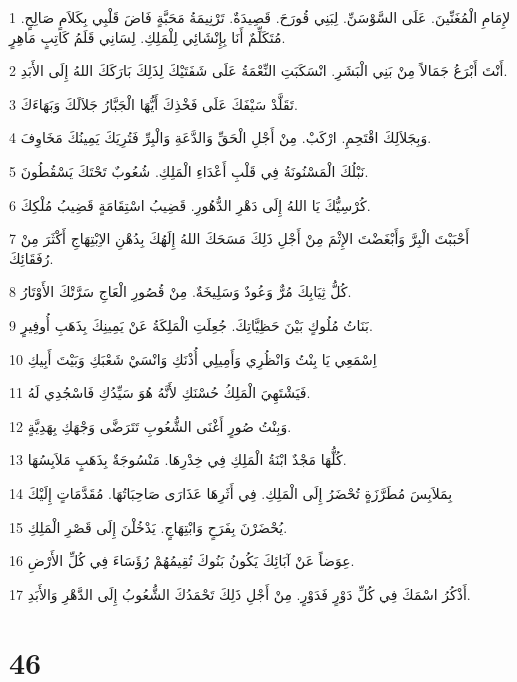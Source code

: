 \par 1 لإِمَامِ الْمُغَنِّينَ. عَلَى السَّوْسَنِّ. لِبَنِي قُورَحَ. قَصِيدَةٌ. تَرْنِيمَةُ مَحَبَّةٍ فَاضَ قَلْبِي بِكَلاَمٍ صَالِحٍ. مُتَكَلِّمٌ أَنَا بِإِنْشَائِي لِلْمَلِكِ. لِسَانِي قَلَمُ كَاتِبٍ مَاهِرٍ.
\par 2 أَنْتَ أَبْرَعُ جَمَالاً مِنْ بَنِي الْبَشَرِ. انْسَكَبَتِ النِّعْمَةُ عَلَى شَفَتَيْكَ لِذَلِكَ بَارَكَكَ اللهُ إِلَى الأَبَدِ.
\par 3 تَقَلَّدْ سَيْفَكَ عَلَى فَخْذِكَ أَيُّهَا الْجَبَّارُ جَلاَلَكَ وَبَهَاءَكَ.
\par 4 وَبِجَلاَلِكَ اقْتَحِمِ. ارْكَبْ. مِنْ أَجْلِ الْحَقِّ وَالدَّعَةِ وَالْبِرِّ فَتُرِيَكَ يَمِينُكَ مَخَاوِفَ.
\par 5 نَبْلُكَ الْمَسْنُونَةُ فِي قَلْبِ أَعْدَاءِ الْمَلِكِ. شُعُوبٌ تَحْتَكَ يَسْقُطُونَ.
\par 6 كُرْسِيُّكَ يَا اللهُ إِلَى دَهْرِ الدُّهُورِ. قَضِيبُ اسْتِقَامَةٍ قَضِيبُ مُلْكِكَ.
\par 7 أَحْبَبْتَ الْبِرَّ وَأَبْغَضْتَ الإِثْمَ مِنْ أَجْلِ ذَلِكَ مَسَحَكَ اللهُ إِلَهُكَ بِدُهْنِ الاِبْتِهَاجِ أَكْثَرَ مِنْ رُفَقَائِكَ.
\par 8 كُلُّ ثِيَابِكَ مُرٌّ وَعُودٌ وَسَلِيخَةٌ. مِنْ قُصُورِ الْعَاجِ سَرَّتْكَ الأَوْتَارُ.
\par 9 بَنَاتُ مُلُوكٍ بَيْنَ حَظِيَّاتِكَ. جُعِلَتِ الْمَلِكَةُ عَنْ يَمِينِكَ بِذَهَبِ أُوفِيرٍ.
\par 10 اِسْمَعِي يَا بِنْتُ وَانْظُرِي وَأَمِيلِي أُذْنَكِ وَانْسَيْ شَعْبَكِ وَبَيْتَ أَبِيكِ
\par 11 فَيَشْتَهِيَ الْمَلِكُ حُسْنَكِ لأَنَّهُ هُوَ سَيِّدُكِ فَاسْجُدِي لَهُ.
\par 12 وَبِنْتُ صُورٍ أَغْنَى الشُّعُوبِ تَتَرَضَّى وَجْهَكِ بِهَدِيَّةٍ.
\par 13 كُلُّهَا مَجْدٌ ابْنَةُ الْمَلِكِ فِي خِدْرِهَا. مَنْسُوجَةٌ بِذَهَبٍ مَلاَبِسُهَا.
\par 14 بِمَلاَبِسَ مُطَرَّزَةٍ تُحْضَرُ إِلَى الْمَلِكِ. فِي أَثَرِهَا عَذَارَى صَاحِبَاتُهَا. مُقَدَّمَاتٍ إِلَيْكَ
\par 15 يُحْضَرْنَ بِفَرَحٍ وَابْتِهَاجٍ. يَدْخُلْنَ إِلَى قَصْرِ الْمَلِكِ.
\par 16 عِوَضاً عَنْ آبَائِكَ يَكُونُ بَنُوكَ تُقِيمُهُمْ رُؤَسَاءَ فِي كُلِّ الأَرْضِ.
\par 17 أَذْكُرُ اسْمَكَ فِي كُلِّ دَوْرٍ فَدَوْرٍ. مِنْ أَجْلِ ذَلِكَ تَحْمَدُكَ الشُّعُوبُ إِلَى الدَّهْرِ وَالأَبَدِ.

\chapter{46}

